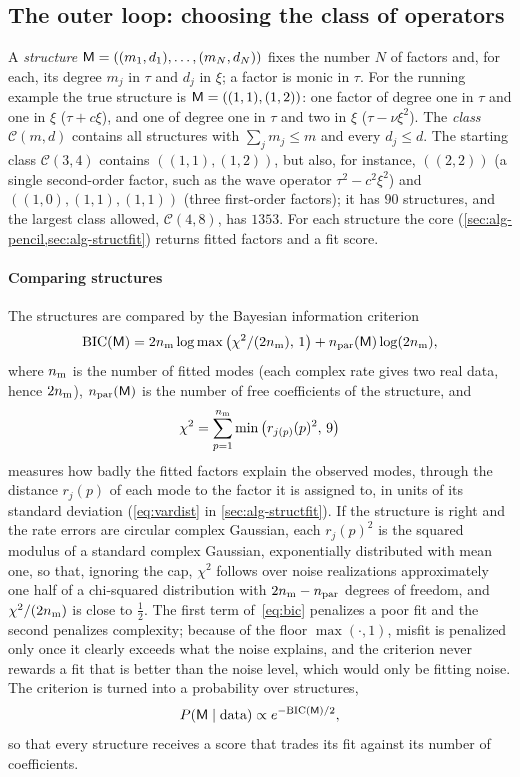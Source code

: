 \subsection{The outer loop: choosing the class of operators}\label{sec:alg-loop}
A \emph{structure} $\mathsf{M}=((m_1,d_1),\dots,(m_N,d_N))$ fixes the number $N$ of factors and, for each,
its degree $m_j$ in $\tau$ and $d_j$ in $\xi$; a factor is monic in $\tau$. For the running example the true structure is
$\mathsf{M}=((1,1),(1,2))$: one factor of degree one in $\tau$ and one in $\xi$ ($\tau+c\xi$), and one of degree one in $\tau$
and two in $\xi$ ($\tau-\nu\xi^2$). The \emph{class} $\mathcal C(m,d)$ contains all structures with $\sum_jm_j\le m$ and
every $d_j\le d$. The starting class $\mathcal C(3,4)$ contains $((1,1),(1,2))$, but also, for instance, $((2,2))$ (a single
second-order factor, such as the wave operator $\tau^2-c^2\xi^2$) and $((1,0),(1,1),(1,1))$ (three first-order factors);
it has $90$ structures, and the largest class allowed, $\mathcal C(4,8)$, has $1353$. For each structure the core
(\cref{sec:alg-pencil,sec:alg-structfit}) returns fitted factors and a fit score.

\paragraph{Comparing structures} The structures are compared by the Bayesian information criterion
\begin{equation}\label{eq:bic}
  \mathrm{BIC}(\mathsf{M})=2n_{\rm m}\log\max\big(\chi^2/(2n_{\rm m}),\,1\big)+n_{\rm par}(\mathsf{M})\log(2n_{\rm m}),
\end{equation}
where $n_{\rm m}$ is the number of fitted modes (each complex rate gives two real data, hence $2n_{\rm m}$),
$n_{\rm par}(\mathsf{M})$ is the number of free coefficients of the structure, and
\[
  \chi^2=\sum_{p=1}^{n_{\rm m}}\min\big(r_{j(p)}(p)^2,\,9\big)
\]
measures how badly the fitted factors explain the observed modes, through the distance $r_j(p)$ of each mode to the
factor it is assigned to, in units of its standard deviation (\eqref{eq:vardist} in \cref{sec:alg-structfit}). If the
structure is right and the rate errors are circular complex Gaussian, each $r_j(p)^2$ is the squared modulus of a
standard complex Gaussian, exponentially distributed with mean one, so that, ignoring the cap, $\chi^2$ follows over
noise realizations approximately one half of a chi-squared distribution with $2n_{\rm m}-n_{\rm par}$ degrees of
freedom, and $\chi^2/(2n_{\rm m})$ is close to $\tfrac12$. The first term of~\eqref{eq:bic} penalizes a poor fit and the
second penalizes complexity; because of the floor $\max(\cdot,1)$, misfit is penalized only once it clearly exceeds what
the noise explains, and the criterion never rewards a fit that is better than the noise level, which would only be
fitting noise. The criterion is turned into a
probability over structures,
\begin{equation}\label{eq:bic-post}
  P(\mathsf{M}\mid\text{data})\propto e^{-\mathrm{BIC}(\mathsf{M})/2},
\end{equation}
so that every structure receives a score that trades its fit against its number of coefficients.

